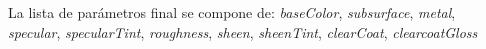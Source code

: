     La lista de par\'ametros final se compone de: \textit{baseColor}, \textit{subsurface}, \textit{metal}, \textit{specular}, \textit{specularTint},
    \textit{roughness}, \textit{sheen}, \textit{sheenTint}, \textit{clearCoat}, \textit{clearcoatGloss}
    
    
    
